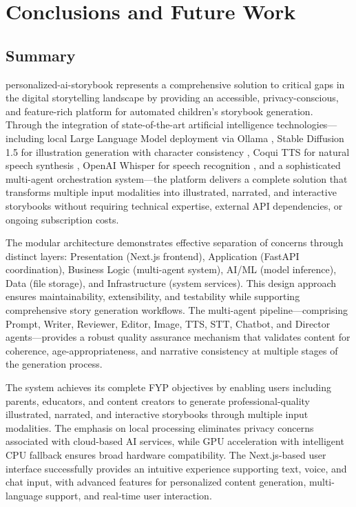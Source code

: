 \chapter{Conclusions and Future Work}
\label{sec:conclusions}

\section{Summary}
personalized-ai-storybook represents a comprehensive solution to critical gaps in the digital storytelling landscape by providing an accessible, privacy-conscious, and feature-rich platform for automated children's storybook generation. Through the integration of state-of-the-art artificial intelligence technologies—including local Large Language Model deployment via Ollama \cite{ollama2024}, Stable Diffusion 1.5 for illustration generation with character consistency \cite{rombach2022highresolution}, Coqui TTS for natural speech synthesis \cite{coqui2024}, OpenAI Whisper for speech recognition \cite{whisper2023}, and a sophisticated multi-agent orchestration system—the platform delivers a complete solution that transforms multiple input modalities into illustrated, narrated, and interactive storybooks without requiring technical expertise, external API dependencies, or ongoing subscription costs.

The modular architecture demonstrates effective separation of concerns through distinct layers: Presentation (Next.js frontend), Application (FastAPI coordination), Business Logic (multi-agent system), AI/ML (model inference), Data (file storage), and Infrastructure (system services). This design approach ensures maintainability, extensibility, and testability while supporting comprehensive story generation workflows. The multi-agent pipeline—comprising Prompt, Writer, Reviewer, Editor, Image, TTS, STT, Chatbot, and Director agents—provides a robust quality assurance mechanism that validates content for coherence, age-appropriateness, and narrative consistency at multiple stages of the generation process.

The system achieves its complete FYP objectives by enabling users including parents, educators, and content creators to generate professional-quality illustrated, narrated, and interactive storybooks through multiple input modalities. The emphasis on local processing eliminates privacy concerns associated with cloud-based AI services, while GPU acceleration with intelligent CPU fallback ensures broad hardware compatibility. The Next.js-based user interface successfully provides an intuitive experience supporting text, voice, and chat input, with advanced features for personalized content generation, multi-language support, and real-time user interaction.

